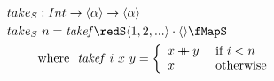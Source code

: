 \documentclass[preview]{standalone}
\begin{document}
\begin{align*}
  take_S &: Int \rightarrow \vect{\alpha} \rightarrow \vect{\alpha} \\
  take_S &\ n = \mathit{takef} \redS \vect{1,2,...} \cdot \vect{} \fMapS\\
         & \text{where}\ \ \mathit{takef}\ i\ x\ y = 
           \left\{\begin{array}{ll}
                    x \fcat y & \text{ if } i < n\\
                    x & \text{ otherwise}
                  \end{array}
           \right.\\
\end{align*}
\end{document}

